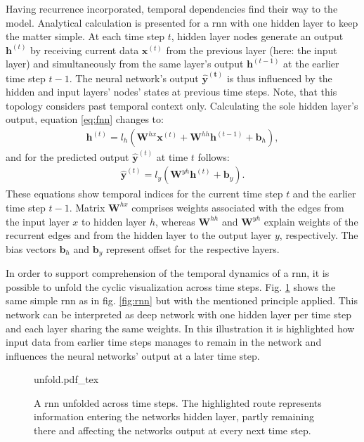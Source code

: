 Having recurrence incorporated, temporal dependencies find their way to the model.
Analytical calculation is presented for a \gls{rnn} with one hidden layer to keep the matter simple.
At each time step $t$, hidden layer nodes generate an output $\bm{h}^{(t)}$ by receiving current data $\bm{x}^{(t)}$  from the previous layer (here: the input layer) and simultaneously from the same layer's output $\bm{h}^{(t-1)}$ at the earlier time step $t -1$.
The neural network's output $\bm{\hat{y}^{(t)}}$ is thus influenced by the hidden and input layers' nodes' states at previous time steps.
Note, that this topology considers past temporal context only.
Calculating the sole hidden layer's output, equation \ref{eq:fnn} changes to:
\begin{align}
	\bm{h}^{(t)} = l_h\left(\bm{W}^{hx}\bm{x}^{(t)}+\bm{W}^{hh}\bm{h}^{(t-1)}+\bm{b}_h\right),
\end{align}
and for the predicted output $\bm{\hat{y}}^{(t)}$ at time $t$ follows:
\begin{align}
	\bm{\hat{y}}^{(t)} = l_y\left(\bm{W}^{yh}\bm{h}^{(t)}+\bm{b}_y\right).
\end{align}
These equations show temporal indices for the current time step $t$ and the earlier time step $t-1$.
Matrix $\bm{W}^{hx}$ comprises weights associated with the edges from the input layer $x$ to hidden layer $h$, whereas $\bm{W}^{hh}$ and $\bm{W}^{yh}$ explain weights of the recurrent edges and from the hidden layer to the output layer $y$, respectively.
The bias vectors $\bm{b}_h$ and $\bm{b}_y$ represent offset for the respective layers.

In order to support comprehension of the temporal dynamics of a \gls{rnn}, it is possible to unfold the cyclic visualization across time steps.
Fig. \ref{fig:unfold} shows the same simple \gls{rnn} as in fig. \ref{fig:rnn} but with the mentioned principle applied.
This network can be interpreted as deep network with one hidden layer per time step and each layer sharing the same weights.
In this illustration it is highlighted how input data from earlier time steps manages to remain in the network and influences the neural networks' output at a later time step.
\begin{figure}
	\centering
	\def\svgwidth{0.8\columnwidth}
         {unfold.pdf_tex}
         \caption{A \gls{rnn} unfolded across time steps. The highlighted route represents information entering the networks hidden layer, partly remaining there and affecting the networks output at every next time step.}
	\label{fig:unfold}
\end{figure}

